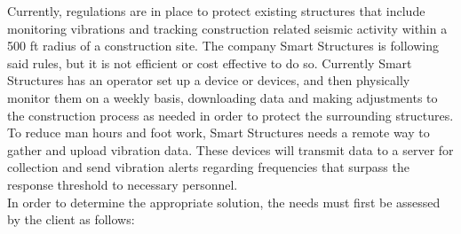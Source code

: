 \documentclass[12pt]{article}
\begin{document}
Currently, regulations are in place to protect existing structures that include monitoring vibrations and tracking construction related seismic activity within a 500 ft radius of a construction site. The company Smart Structures is following said rules, but it is not efficient or cost effective to do so. Currently Smart Structures has an operator set up a device or devices, and then physically monitor them on a weekly basis, downloading data and making adjustments to the construction process as needed in order to protect the surrounding structures.  To reduce man hours and foot work, Smart Structures needs a remote way to gather and upload vibration data.  These devices will transmit data to a server for collection and send vibration alerts regarding frequencies that surpass the response threshold to necessary personnel.\\

In order to determine the appropriate solution, the needs must first be assessed by the client as follows:\\
\end{document}
